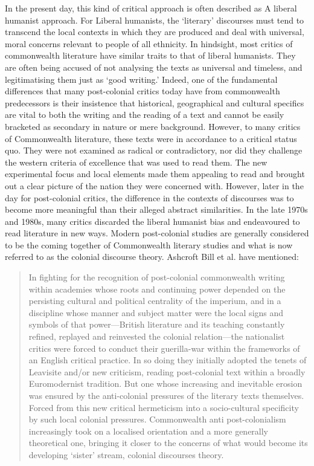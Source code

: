 In the present day, this kind of critical approach is often described as A liberal humanist approach. For Liberal humanists, the ‘literary’ discourses must tend to transcend the local contexts in which they are produced and deal with universal, moral concerns relevant to people of all ethnicity. In hindsight, most critics of commonwealth literature have similar traits to that of liberal humanists. They are often being accused of not analysing the texts as universal and timeless, and legitimatising them just as ‘good writing.’ Indeed, one of the fundamental differences that many post-colonial critics today have from commonwealth predecessors is their insistence that historical, geographical and cultural specifics are vital to both the writing and the reading of a text and cannot be easily bracketed as secondary in nature or mere background. However, to many critics of Commonwealth literature, these texts were in accordance to a critical status quo. They were not examined as radical or contradictory, nor did they challenge the western criteria of excellence that was used to read them. The new experimental focus and local elements made them appealing to read and brought out a clear picture of the nation they were concerned with. However, later in the day for post-colonial critics, the difference in the contexts of discourses was to become more meaningful than their alleged abstract similarities. In the late 1970s and 1980s, many critics discarded the liberal humanist bias and endeavoured to read literature in new ways. Modern post-colonial studies are generally considered to be the coming together of Commonwealth literary studies and what is now referred to as the colonial discourse theory. Ashcroft Bill et al. have mentioned:

\begin{quote}
 In fighting for the recognition of post-colonial commonwealth writing within academies whose roots and continuing power depended on the persisting cultural and political centrality of the imperium, and in a discipline whose manner and subject matter were the local signs and symbols of that power—British literature and its teaching constantly refined, replayed and reinvested the colonial relation—the nationalist critics were forced to conduct their guerilla-war within the frameworks of an English critical practice. In so doing they initially adopted the tenets of Leavisite and/or new criticism, reading post-colonial text within a broadly Euromodernist tradition. But one whose increasing and inevitable erosion was ensured by the anti-colonial pressures of the literary texts themselves. Forced from this new critical hermeticism into a socio-cultural specificity by such local colonial pressures. Commonwealth anti post-colonialism increasingly took on a localised orientation and a more generally theoretical one, bringing it closer to the concerns of what would become its developing ‘sister’ stream, colonial discourses theory. \parencite[p.~53--54]{Ashcroft}
\end{quote}

